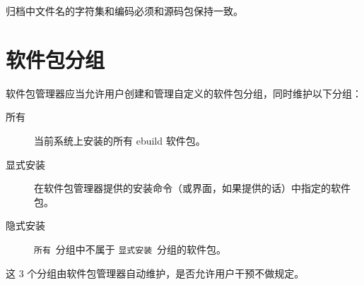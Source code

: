 归档中文件名的字符集和编码必须和源码包保持一致。

\section{软件包分组}
软件包管理器应当允许用户创建和管理自定义的软件包分组，同时维护以下分组：
\begin{description}
\item[所有] 当前系统上安装的所有 ebuild 软件包。
\item[显式安装] 在软件包管理器提供的安装命令（或界面，如果提供的话）中指定的软件包。
\item[隐式安装] \texttt{所有}\ 分组中不属于 \texttt{显式安装}\ 分组的软件包。
\end{description}

这 3 个分组由软件包管理器自动维护，是否允许用户干预不做规定。


